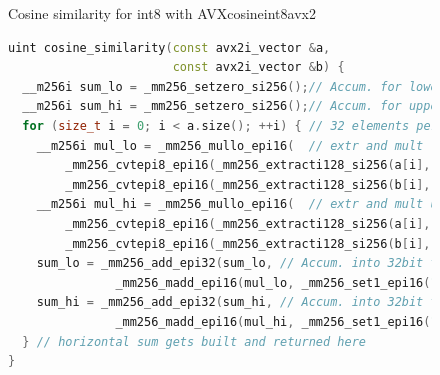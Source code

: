 \begin{figure}[h]
    \begin{algorithm}{Cosine similarity for int8 with AVX}{cosineint8avx2}
        \begin{lstlisting}[language=C++]
uint cosine_similarity(const avx2i_vector &a,
                       const avx2i_vector &b) {
  __m256i sum_lo = _mm256_setzero_si256();// Accum. for lower 128 bits
  __m256i sum_hi = _mm256_setzero_si256();// Accum. for upper 128 bits
  for (size_t i = 0; i < a.size(); ++i) { // 32 elements per iteration
    __m256i mul_lo = _mm256_mullo_epi16(  // extr and mult lower 128 bits
        _mm256_cvtepi8_epi16(_mm256_extracti128_si256(a[i], 0)),
        _mm256_cvtepi8_epi16(_mm256_extracti128_si256(b[i], 0)));
    __m256i mul_hi = _mm256_mullo_epi16(  // extr and mult upper 128 bits
        _mm256_cvtepi8_epi16(_mm256_extracti128_si256(a[i], 1)),
        _mm256_cvtepi8_epi16(_mm256_extracti128_si256(b[i], 1)));
    sum_lo = _mm256_add_epi32(sum_lo, // Accum. into 32bit to prev overfl
               _mm256_madd_epi16(mul_lo, _mm256_set1_epi16(1)));
    sum_hi = _mm256_add_epi32(sum_hi, // Accum. into 32bit to prev overfl
               _mm256_madd_epi16(mul_hi, _mm256_set1_epi16(1)));
  } // horizontal sum gets built and returned here
}
    \end{lstlisting}
    \end{algorithm}
\end{figure}

